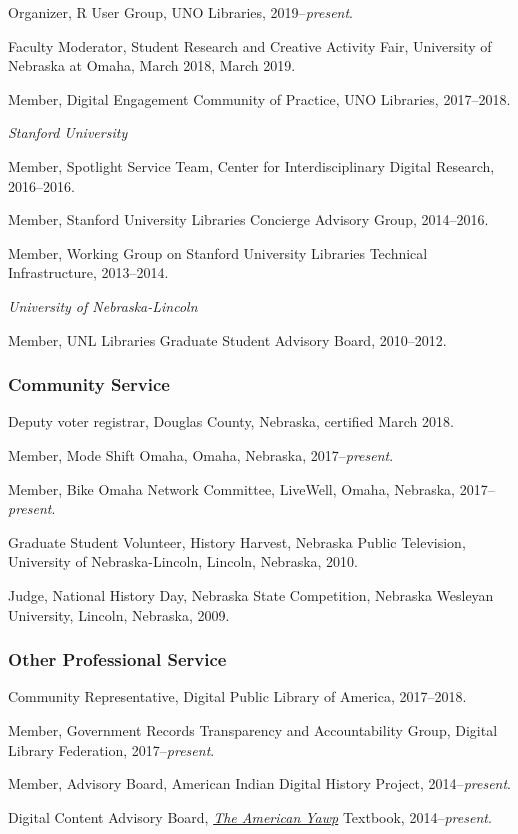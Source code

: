 Organizer, R User Group, UNO Libraries, 2019--\emph{present}.

Faculty Moderator, Student Research and Creative Activity Fair,
University of Nebraska at Omaha, March 2018, March 2019.

Member, Digital Engagement Community of Practice, UNO Libraries,
2017--2018.

\vspace{.4cm}

\emph{Stanford University}

Member, Spotlight Service Team, Center for Interdisciplinary Digital
Research, 2016--2016.

Member, Stanford University Libraries Concierge Advisory Group,
2014--2016.

Member, Working Group on Stanford University Libraries Technical
Infrastructure, 2013--2014.

\vspace{.4cm}

\emph{University of Nebraska-Lincoln}

Member, UNL Libraries Graduate Student Advisory Board, 2010--2012.

\subsubsection{Community Service}\label{community-service}

Deputy voter registrar, Douglas County, Nebraska, certified March 2018.

Member, Mode Shift Omaha, Omaha, Nebraska, 2017--\emph{present}.

Member, Bike Omaha Network Committee, LiveWell, Omaha, Nebraska,
2017--\emph{present}.

Graduate Student Volunteer, History Harvest, Nebraska Public Television,
University of Nebraska-Lincoln, Lincoln, Nebraska, 2010.

Judge, National History Day, Nebraska State Competition, Nebraska
Wesleyan University, Lincoln, Nebraska, 2009.

\subsubsection{Other Professional
Service}\label{other-professional-service}

Community Representative, Digital Public Library of America, 2017--2018.

Member, Government Records Transparency and Accountability Group,
Digital Library Federation, 2017--\emph{present}.

Member, Advisory Board, American Indian Digital History Project,
2014--\emph{present}.

Digital Content Advisory Board, \emph{\href{http://americanyawp.com}{The
American Yawp}} Textbook, 2014--\emph{present}.
